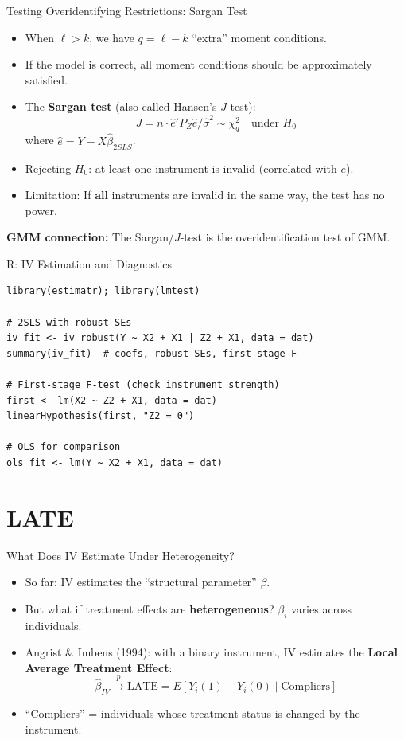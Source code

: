 \documentclass[aspectratio=169, handout]{beamer}
\numberwithin{equation}{section}
\begin{document}
\begin{frame}{Testing Overidentifying Restrictions: Sargan Test}
\begin{itemize}
\item When $\ell>k$, we have $q=\ell-k$ ``extra'' moment conditions.
\item If the model is correct, all moment conditions should be approximately satisfied.
\item The \textbf{Sargan test} (also called Hansen's $J$-test):
$$J = n\cdot\hat{e}'P_Z\hat{e}/\hat{\sigma}^2 \sim \chi^2_q \quad \text{under } H_0$$
where $\hat{e}=Y-X\hat{\beta}_{2SLS}$.
\item Rejecting $H_0$: at least one instrument is invalid (correlated with $e$).
\item \alert{Limitation:} If \textbf{all} instruments are invalid in the same way, the test has no power.
\end{itemize}
\begin{tcolorbox}[colback=blue!5, colframe=blue!50]
\textbf{GMM connection:} The Sargan/$J$-test is the overidentification test of GMM.
\end{tcolorbox}
\end{frame}


\begin{frame}[fragile]{R: IV Estimation and Diagnostics}
\begin{lstlisting}
library(estimatr); library(lmtest)

# 2SLS with robust SEs
iv_fit <- iv_robust(Y ~ X2 + X1 | Z2 + X1, data = dat)
summary(iv_fit)  # coefs, robust SEs, first-stage F

# First-stage F-test (check instrument strength)
first <- lm(X2 ~ Z2 + X1, data = dat)
linearHypothesis(first, "Z2 = 0")

# OLS for comparison
ols_fit <- lm(Y ~ X2 + X1, data = dat)
\end{lstlisting}
\end{frame}


\section{LATE}

\begin{frame}{What Does IV Estimate Under Heterogeneity?}
\begin{itemize}
\item So far: IV estimates the ``structural parameter'' $\beta$.
\item But what if treatment effects are \textbf{heterogeneous}?  $\beta_i$ varies across individuals.
\item Angrist \& Imbens (1994): with a binary instrument, IV estimates the \textbf{Local Average Treatment Effect}:
$$\hat{\beta}_{IV} \xrightarrow{p} \text{LATE} = E[Y_i(1)-Y_i(0) \mid \text{Compliers}]$$
\item ``Compliers'' = individuals whose treatment status is changed by the instrument.
\end{itemize}
\end{frame}
\end{document}
